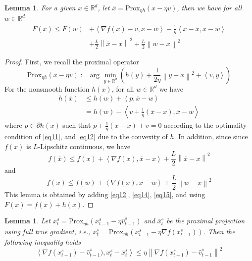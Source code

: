 \documentclass{article}
\newcommand*{\R}{\mathbb{R}}
\newcommand*{\Po}{\text{Prox}}
\newcommand{\norm}[1]{\left\lVert#1\right\rVert}
\newcommand{\Iprod}[2]{\left\langle #1,#2\right\rangle}
\newtheorem{lemma}[theorem]{Lemma}
\theoremstyle{definition}
\theoremstyle{remark}
\begin{document}
\begin{lemma}\label{lemma1}
For a given $x \in \R^d$, let $\overline{x} = \Po_{\eta h}(x-\eta v)$, then we have for all $w\in \R^d$
\begin{equation}\label{eq10}
\begin{split}
F(\overline{x}) \leq F(w) &+ \Iprod{\nabla f(x)-v}{\overline{x}-w}-\frac{1}{\eta} \Iprod{\overline{x}-x}{\overline{x}-w}\\
&+\frac{L}{2}\norm{\overline{x}-x}^2+\frac{L}{2}\norm{w-x}^2 
\end{split}
\end{equation}
\end{lemma}
\begin{proof}
First, we recall the proximal operator 
\begin{equation}\label{eq11}
\Po_{\eta h}(x-\eta v) := \text{arg}\,\,\min_{y\in\R^d}\left(h(y)+\frac{1}{2\eta}\norm{y-x}^2+\Iprod{v}{y}\right)
\end{equation}
For the nonsmooth function $h(x)$, for all $w\in\R^d$ we have 
\begin{equation}\label{eq12}
\begin{split}
h(\overline{x}) &\leq h(w) + \Iprod{p}{\overline{x}-w}\\
&= h(w) - \Iprod{v+\frac{1}{\eta}(\overline{x}-x)}{\overline{x}-w}
\end{split}
\end{equation}
where $p\in \partial h(\overline{x})$ such that $p+\frac{1}{\eta}(\overline{x}-x)+v = 0$ according to the optimality condition of \eqref{eq11}, and \eqref{eq12} due to the convexity of $h$. In addition, since since $f(x)$ is $L$-Lipschitz continuous, we have
\begin{equation}\label{eq14}
f(\overline{x}) \leq f(x)+\Iprod{\nabla f(x)}{\overline{x}-x}+\frac{L}{2}\norm{\overline{x}-x}^2
\end{equation}
and
\begin{equation}\label{eq15}
f(x) \leq f(w)+\Iprod{\nabla f(x)}{x-w}+\frac{L}{2}\norm{w-x}^2
\end{equation}
 This lemma is obtained by adding \eqref{eq12}, \eqref{eq14}, \eqref{eq15}, and using $F(x) = f(x)+h(x)$. 
\end{proof}
\begin{lemma}\label{lemm-est-grad}
Let  $x_{t}^s= \Po_{\eta h}(x_{t-1}^s - \eta \hat{v}_{t-1}^s)$ and $\overline{x}_{t}^s$ be the proximal projection using full true gradient, i.e., $\overline{x}_{t}^s= \Po_{\eta h}(x_{t-1}^s - \eta \nabla f(x_{t-1}^s))$. Then the following inequality holds
\[
\Iprod{\nabla f(x_{t-1}^s) -\hat{v}_{t-1}^s)}{x_t^s -\overline{x}_t^s} \leq \eta\norm{\nabla f(x_{t-1}^s)-\hat{v}_{t-1}^s}^2
\]
\end{lemma}
\end{document}
